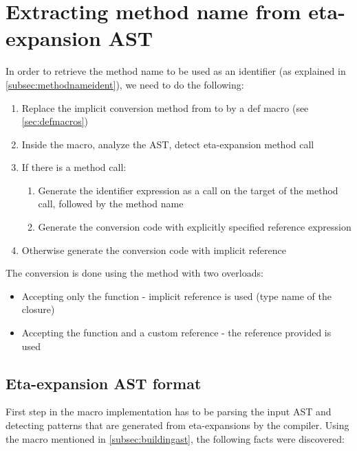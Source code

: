 \section{Extracting method name from eta-expansion AST}

In order to retrieve the method name to be used as an identifier (as explained in \ref{subsec:methodnameident}), we need to do the following:

\begin{enumerate}
	\item Replace the implicit conversion method from  to  by a def macro (see \ref{sec:defmacros})
	\item Inside the macro, analyze the AST, detect eta-expansion method call
	\item If there is a method call:
	\begin{enumerate}
		\item Generate the identifier expression as a  call on the target of the method call, followed by the method name
		\item Generate the conversion code with explicitly specified reference expression
	\end{enumerate}
	\item Otherwise generate the conversion code with implicit reference	
\end{enumerate}

The conversion is done using the  method with two overloads:
\begin{itemize}
	\item Accepting only the function - implicit reference is used (type name of the closure)
	\item Accepting the function and a custom reference - the reference provided is used
\end{itemize}

\subsection{Eta-expansion AST format}

First step in the macro implementation has to be parsing the input AST and detecting patterns that are generated from eta-expansions by the compiler. Using the  macro mentioned in \ref{subsec:buildingast}, the following facts were discovered:

